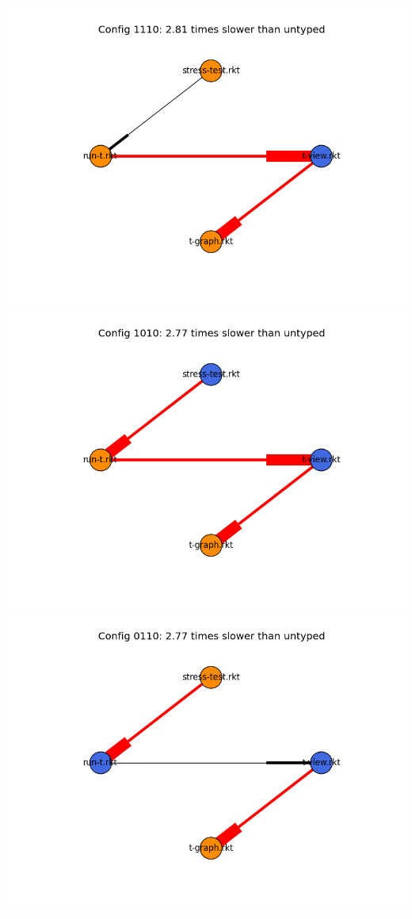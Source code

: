 \documentclass{article}
\begin{document}
\includegraphics[width=\textwidth]{mbta-fixed-04-25-module-graph-1110.png}
\includegraphics[width=\textwidth]{mbta-fixed-04-25-module-graph-1010.png}
\includegraphics[width=\textwidth]{mbta-fixed-04-25-module-graph-0110.png}
\end{document}

